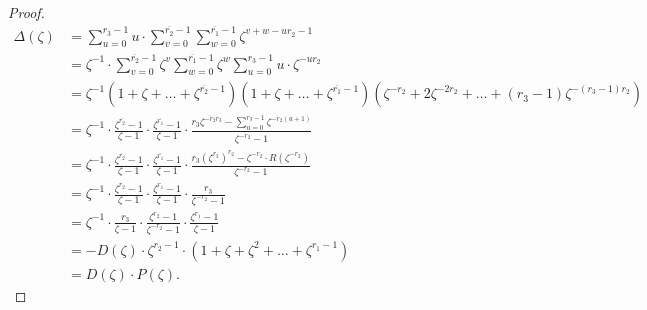 \documentclass[12pt,a4paper]{article}
\theoremstyle{definition}
\newcommand{\z}{\zeta}
\newcommand{\uo}{\overline{r_2}}
\newcommand{\vo}{\overline{r_1}}
\begin{document}
\begin{proof}
\begin{equation*}\label{Delta}
\begin{split}
\Delta(\zeta)&=
\sum_{u=0}^{r_3-1}u\cdot\sum_{v=0}^{\uo-1} \sum _{w=0}^{\vo-1} \z^{v+w-ur_2-1}\\
&=\z^{-1}\cdot\sum_{v=0}^{\uo-1}\z^v \sum _{w=0}^{\vo-1} \z^{w}\sum_{u=0}^{r_3-1}u\cdot\z^{-ur_2}\\
&=\z^{-1}(1+\z+\!\dots\!+\z^{\uo-1})(1\!+\z+\!\dots\!+\z^{\vo-1})(\z^{-r_2}+2\z^{-2r_2}+\!\dots\!+(r_3-1)\z^{-(r_3-1)r_2})\\
&=\z^{-1} \cdot \frac{\zeta^{\uo}-1}{\zeta-1}\cdot \frac{\zeta^{\vo}-1}{\zeta-1}\cdot \frac{r_3\z^{\overline{-r_2}r_3}-\sum_{u=0}^{r_3-1}\z^{\overline{-r_2}(u+1)}}{\z^{\overline{-r_2}}-1}
\\
&=\z^{-1} \cdot \frac{\zeta^{\uo}-1}{\zeta-1}\cdot \frac{\zeta^{\vo}-1}{\zeta-1}\cdot \frac{r_3(\z^{r_3})^{r_2}-\zeta^{-r_2}\cdot R(\zeta^{-r_2})}{\z^{-r_2}-1}
\\
&=\z^{-1}\cdot\frac{\zeta^{r_2}-1}{\zeta-1}\cdot \frac{\zeta^{r_1}-1}{\zeta-1} \cdot \frac{r_3}{\zeta^{-r_2}-1}\\
&=\z^{-1}\cdot\frac{r_3}{\zeta-1}\cdot \frac{\zeta^{r_2}-1}{\zeta^{-r_2}-1}\cdot \frac{\zeta^{r_1}-1}{\zeta-1}\\
&=-D(\zeta)\cdot \zeta^{r_2-1}\cdot (1+\zeta+\zeta^2+\dots+\zeta^{r_1-1})\\
&=D(\zeta)\cdot P(\zeta).
\end{split}
\end{equation*}
\end{proof}
\end{document}
